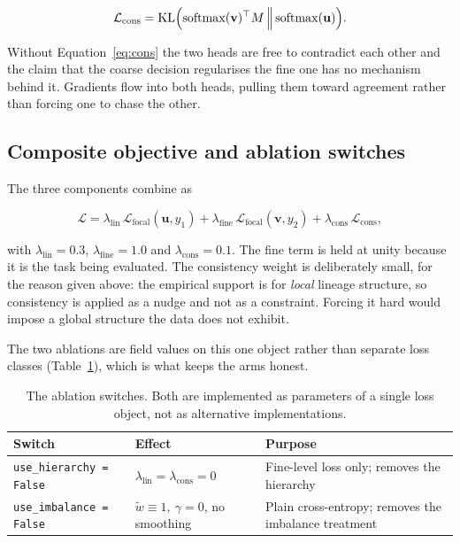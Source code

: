 \documentclass[11pt,a4paper]{article}
\begin{document}
\begin{equation}
  \mathcal{L}_{\text{cons}}
    = \mathrm{KL}\Bigl(
        \mathrm{softmax}(\mathbf{v})^{\top} M
        \,\Bigl\|\,
        \mathrm{softmax}(\mathbf{u})
      \Bigr).
  \label{eq:cons}
\end{equation}

Without Equation~\eqref{eq:cons} the two heads are free to contradict each other
and the claim that the coarse decision regularises the fine one has no mechanism
behind it. Gradients flow into both heads, pulling them toward agreement rather
than forcing one to chase the other.

\subsection{Composite objective and ablation switches}

The three components combine as

\begin{equation}
  \mathcal{L} = \lambda_{\text{lin}}\,\mathcal{L}_{\text{focal}}(\mathbf{u}, y_1)
              + \lambda_{\text{fine}}\,\mathcal{L}_{\text{focal}}(\mathbf{v}, y_2)
              + \lambda_{\text{cons}}\,\mathcal{L}_{\text{cons}},
  \label{eq:total}
\end{equation}

with $\lambda_{\text{lin}} = 0.3$, $\lambda_{\text{fine}} = 1.0$ and
$\lambda_{\text{cons}} = 0.1$. The fine term is held at unity because it is the
task being evaluated. The consistency weight is deliberately small, for the
reason given above: the empirical support is for \emph{local} lineage structure,
so consistency is applied as a nudge and not as a constraint. Forcing it hard
would impose a global structure the data does not exhibit.

The two ablations are field values on this one object rather than separate loss
classes (Table~\ref{tab:ablation}), which is what keeps the arms honest.

\begin{table}[H]
  \centering
  \small
  \caption{The ablation switches. Both are implemented as parameters of a single
  loss object, not as alternative implementations.}
  \label{tab:ablation}
  \begin{tabular}{@{}lll@{}}
    \toprule
    Switch & Effect & Purpose \\
    \midrule
    \texttt{use\_hierarchy = False}
      & $\lambda_{\text{lin}} = \lambda_{\text{cons}} = 0$
      & Fine-level loss only; removes the hierarchy \\
    \texttt{use\_imbalance = False}
      & $\tilde{w} \equiv 1,\ \gamma = 0$, no smoothing
      & Plain cross-entropy; removes the imbalance treatment \\
    \bottomrule
  \end{tabular}
\end{table}
\end{document}

